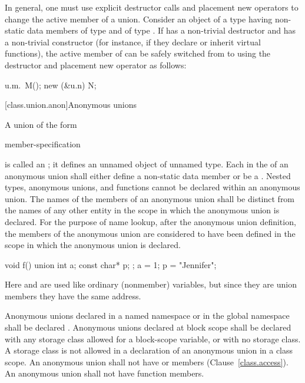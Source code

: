 \pnum
\enternote In general, one must use explicit destructor calls and placement
new operators to change the active member of a union. \exitnote
\enterexample
Consider an object  of a  type  having non-static data members
 of type  and  of type . If  has a non-trivial
destructor and  has a non-trivial constructor (for instance, if they declare or inherit
virtual functions), the active member of  can be safely switched from  to
 using the destructor and placement new operator as follows:

\begin{codeblock}
u.m.~M();
new (&u.n) N;
\end{codeblock}
\exitexample

[class.union.anon]{Anonymous unions}
%

\pnum
A union of the form

\begin{ncbnftab}
 \terminal{\{} member-specification \terminal{\}} \terminal{;}
\end{ncbnftab}

is called an ; it defines an unnamed object of unnamed
type. Each  in the 
of an anonymous union shall either define a non-static data member or be a
.
\enternote
Nested types, anonymous unions, and functions cannot be declared within an anonymous
union.
\exitnote
The names of the members of an anonymous union shall be distinct from
the names of any other entity in the scope in which the anonymous union
is declared. For the purpose of name lookup, after the anonymous union
definition, the members of the anonymous union are considered to have
been defined in the scope in which the anonymous union is declared.
%
\enterexample

\begin{codeblock}
void f() {
  union { int a; const char* p; };
  a = 1;
  p = "Jennifer";
}
\end{codeblock}

Here  and  are used like ordinary (nonmember)
variables, but since they are union members they have the same address.
\exitexample

\pnum
{}%
%
Anonymous unions declared in a named namespace or in the global
namespace shall be declared . Anonymous unions declared at
block scope shall be declared with any storage class allowed for a
block-scope variable, or with no storage class. A storage class is not
allowed in a declaration of an anonymous union in a class scope.
%
%
An anonymous union shall not have  or 
members (Clause~\ref{class.access}). An anonymous union shall not have
function members.

